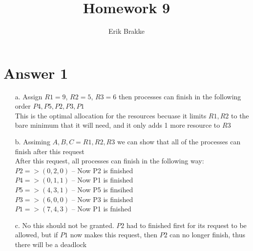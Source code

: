 \documentclass[11pt]{article}
\theoremstyle{definition}
\begin{document}
\title{Homework 9}
\author{Erik Brakke}
\maketitle

\thispagestyle{fancy}


\section*{Answer 1}
\begin{enumerate}
  \item[a.]
  Assign $R1 = 9$, $R2 = 5$, $R3 = 6$ then processes can finish in the following order $P4, P5, P2, P3, P1$\\
  This is the optimal allocation for the resources becuase it limits $R1, R2$ to the bare minimum that it will need, and it only adds 1 more resource to $R3$\\

  \item[b.] Assiming $A,B,C = R1,R2,R3$ we can show that all of the processes can finish after this request\\
  After this request, all processes can finish in the following way:\\
  $P2 => (0,2,0)$ -- Now P2 is finished\\
  $P4 => (0,1,1)$ -- Now P1 is finished\\
  $P5 => (4,3,1)$ -- Now P5 is finsihed\\
  $P3 => (6,0,0)$ -- Now P3 is finished\\
  $P1 => (7,4,3)$ -- Now P1 is fnished\\

  \item[c.] No this should not be granted.  $P2$ had to finished first for its request to be allowed, but if $P1$ now makes this request, then $P2$ can no longer finish, thus there will be a deadlock
\end{enumerate}
\end{document}
